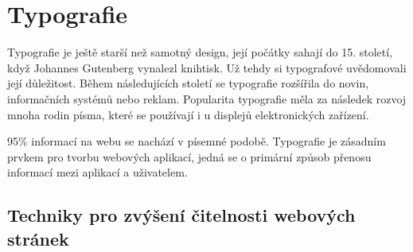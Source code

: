 \section{Typografie}
\label{sec:typografie}

\begin{quote}
     \cite{svalbach}
\end{quote}

\noindent
Typografie je ještě starší než samotný design, její počátky sahají do 15. století, když Johannes Gutenberg vynalezl knihtisk. Už tehdy si typografové uvědomovali její důležitost. Během následujících století se typografie rozšířila do novin, informačních systémů nebo reklam. Popularita typografie měla za následek rozvoj mnoha rodin písma, které se používají i u displejů elektronických zařízení.

\begin{quote}
     \cite{typography}
\end{quote}

95\% informací na webu se nachází v písemné podobě. Typografie je zásadním prvkem pro tvorbu webových aplikací, jedná se o primární způsob přenosu informací mezi aplikací a uživatelem.

\subsection{Techniky pro zvýšení čitelnosti webových stránek}


